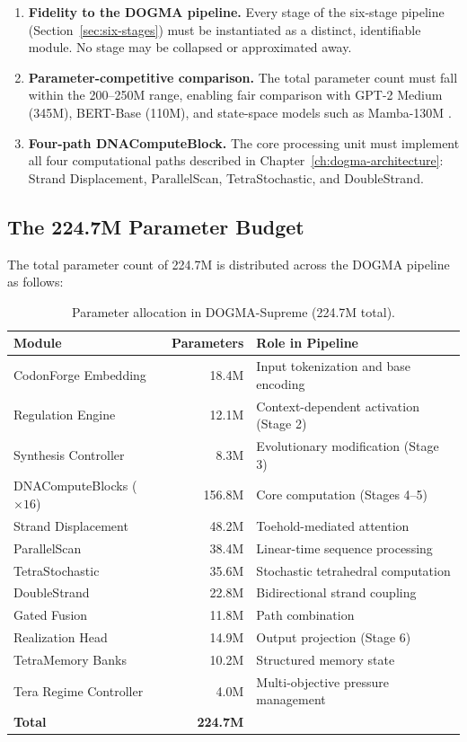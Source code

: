 \begin{enumerate}[leftmargin=1.8em]
  \item \textbf{Fidelity to the DOGMA pipeline.} Every stage of the six-stage pipeline (Section~\ref{sec:six-stages}) must be instantiated as a distinct, identifiable module. No stage may be collapsed or approximated away.
  \item \textbf{Parameter-competitive comparison.} The total parameter count must fall within the 200--250M range, enabling fair comparison with GPT-2 Medium (345M), BERT-Base (110M), and state-space models such as Mamba-130M \citep{gu2023mamba}.
  \item \textbf{Four-path DNAComputeBlock.} The core processing unit must implement all four computational paths described in Chapter~\ref{ch:dogma-architecture}: Strand Displacement, ParallelScan, TetraStochastic, and DoubleStrand.
\end{enumerate}

\subsection{The 224.7M Parameter Budget}
\label{sec:param-budget}

The total parameter count of 224.7M is distributed across the DOGMA pipeline as follows:

\begin{table}[H]
\centering
\caption{Parameter allocation in DOGMA-Supreme (224.7M total).}
\label{tab:param-allocation}
\begin{tabularx}{\textwidth}{L{4.5cm} r Y}
\toprule
\textbf{Module} & \textbf{Parameters} & \textbf{Role in Pipeline} \\
\midrule
CodonForge Embedding    & 18.4M  & Input tokenization and base encoding \\
Regulation Engine       & 12.1M  & Context-dependent activation (Stage 2) \\
Synthesis Controller    & 8.3M   & Evolutionary modification (Stage 3) \\
DNAComputeBlocks ($\times 16$) & 156.8M & Core computation (Stages 4--5) \\
\quad Strand Displacement  & 48.2M  & \quad Toehold-mediated attention \\
\quad ParallelScan         & 38.4M  & \quad Linear-time sequence processing \\
\quad TetraStochastic      & 35.6M  & \quad Stochastic tetrahedral computation \\
\quad DoubleStrand         & 22.8M  & \quad Bidirectional strand coupling \\
\quad Gated Fusion         & 11.8M  & \quad Path combination \\
Realization Head        & 14.9M  & Output projection (Stage 6) \\
TetraMemory Banks       & 10.2M  & Structured memory state \\
Tera Regime Controller  & 4.0M   & Multi-objective pressure management \\
\midrule
\textbf{Total}          & \textbf{224.7M} & \\
\bottomrule
\end{tabularx}
\end{table}

